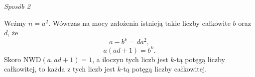 \vspace{10px}

\noindent
\textit{Sposób 2}

\vspace{10px}

\noindent
Weźmy $n = a^2$. Wówczas na mocy założenia istnieją takie liczby całkowite $b$ oraz $d$, że
\[
	a - b^k = da^2,
\]
\[
	a(ad + 1) = b^k.
\]
Skoro $\mathrm{NWD}(a, ad + 1) = 1$, a iloczyn tych liczb jest $k$-tą potęgą liczby całkowitej, to każda z tych liczb jest $k$-tą potęgą liczby całkowitej.

\vspace{10px}

